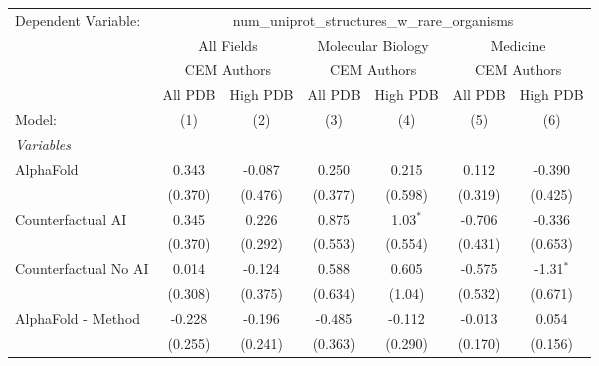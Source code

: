 \begingroup
\centering
\begin{tabular}{lcccccc}
   \tabularnewline \midrule \midrule
   Dependent Variable: & \multicolumn{6}{c}{num\_uniprot\_structures\_w\_rare\_organisms}\\
 & \multicolumn{2}{c}{All Fields} & \multicolumn{2}{c}{Molecular Biology} & \multicolumn{2}{c}{Medicine} \\
\cmidrule(lr){2-3} \cmidrule(lr){4-5} \cmidrule(lr){6-7}
 & \multicolumn{2}{c}{CEM Authors} & \multicolumn{2}{c}{CEM Authors} & \multicolumn{2}{c}{CEM Authors} \\
\cmidrule(lr){2-3} \cmidrule(lr){4-5} \cmidrule(lr){6-7}
 & \multicolumn{1}{c}{All PDB} & \multicolumn{1}{c}{High PDB} & \multicolumn{1}{c}{All PDB} & \multicolumn{1}{c}{High PDB} & \multicolumn{1}{c}{All PDB} & \multicolumn{1}{c}{High PDB} \\
\cmidrule(lr){2-2} \cmidrule(lr){3-3} \cmidrule(lr){4-4} \cmidrule(lr){5-5} \cmidrule(lr){6-6} \cmidrule(lr){7-7}
   Model:                                                     & (1)     & (2)         & (3)           & (4)        & (5)          & (6)\\  
   \midrule
   \emph{Variables}\\
   AlphaFold                                                  & 0.343   & -0.087      & 0.250         & 0.215      & 0.112        & -0.390\\   
                                                              & (0.370) & (0.476)     & (0.377)       & (0.598)    & (0.319)      & (0.425)\\   
   Counterfactual AI                                          & 0.345   & 0.226       & 0.875         & 1.03$^{*}$ & -0.706       & -0.336\\   
                                                              & (0.370) & (0.292)     & (0.553)       & (0.554)    & (0.431)      & (0.653)\\   
   Counterfactual No AI                                       & 0.014   & -0.124      & 0.588         & 0.605      & -0.575       & -1.31$^{*}$\\   
                                                              & (0.308) & (0.375)     & (0.634)       & (1.04)     & (0.532)      & (0.671)\\   
   AlphaFold - Method                                         & -0.228  & -0.196      & -0.485        & -0.112     & -0.013       & 0.054\\   
                                                              & (0.255) & (0.241)     & (0.363)       & (0.290)    & (0.170)      & (0.156)\\   

\end{tabular}
